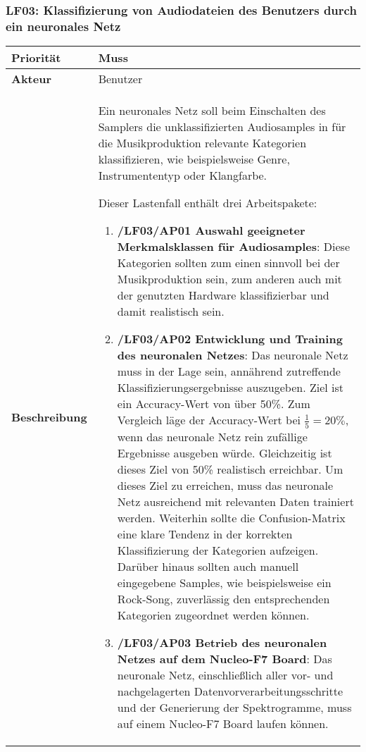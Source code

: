 \subsubsection{LF03: Klassifizierung von Audiodateien des Benutzers durch ein neuronales Netz}
\label{sec:lf-nn-01}

\begin{table}[h!]
	\begin{tabularx}{\textwidth}{|l|X|}
		\hline
		\textbf{Priorität} & Muss \\ \hline
		\textbf{Akteur} & Benutzer \\ \hline
		\textbf{Beschreibung} & Ein neuronales Netz soll beim Einschalten des Samplers die unklassifizierten Audiosamples in für die Musikproduktion relevante Kategorien klassifizieren, wie beispielsweise Genre, Instrumententyp oder Klangfarbe.
		
		Dieser Lastenfall enthält drei Arbeitspakete:
		\begin{enumerate}
    		\item \textbf{/LF03/AP01 Auswahl geeigneter Merkmalsklassen für Audiosamples}: Diese Kategorien sollten zum einen sinnvoll bei der Musikproduktion sein, zum anderen auch mit der genutzten Hardware klassifizierbar und damit realistisch sein.
    		\item \textbf{/LF03/AP02 Entwicklung und Training des neuronalen Netzes}: Das neuronale Netz muss in der Lage sein, annährend zutreffende Klassifizierungsergebnisse auszugeben. Ziel ist ein Accuracy-Wert von über 50\%. Zum Vergleich läge der Accuracy-Wert bei \textit{$\frac{1}{5} = 20\%$}, wenn das neuronale Netz rein zufällige Ergebnisse ausgeben würde. Gleichzeitig ist dieses Ziel von 50\% realistisch erreichbar. Um dieses Ziel zu erreichen, muss das neuronale Netz ausreichend mit relevanten Daten trainiert werden. Weiterhin sollte die Confusion-Matrix eine klare Tendenz in der korrekten Klassifizierung der Kategorien aufzeigen. Darüber hinaus sollten auch manuell eingegebene Samples, wie beispielsweise ein Rock-Song, zuverlässig den entsprechenden Kategorien zugeordnet werden können. 
			\item \textbf{/LF03/AP03 Betrieb des neuronalen Netzes auf dem Nucleo-F7 Board}: Das neuronale Netz, einschließlich aller vor- und nachgelagerten Datenvorverarbeitungsschritte und der Generierung der Spektrogramme, muss auf einem Nucleo-F7 Board laufen können. 
		\end{enumerate}
		\\ \hline
	\end{tabularx}
\end{table}